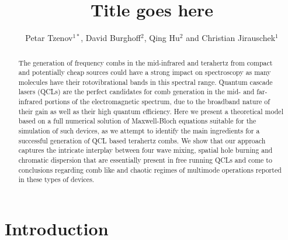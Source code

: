 \documentclass[10pt,letterpaper]{article}
\begin{document}
\title{Title goes here}
\author{Petar Tzenov$^{1*}$,  David Burghoff$^{2}$, Qing Hu$^{2}$ and Christian Jirauschek$^1$}

\address{$^1$ Institute for Nanoelectronics, Technical University f Munich, D-80333 Munich, Germany}
\address{$^2$ Department of Electrical Engineering and Computer Science, Research Laboratory of Electronics, Massachusetts Institute of Technology, Cambridge,
Massachusetts 02139, USA}




\begin{abstract}
The generation of frequency combs in the mid-infrared and terahertz from compact and potentially cheap sources could have a strong impact on spectroscopy as many molecules have their rotovibrational bands in this spectral range. Quantum cascade lasers (QCLs) are the perfect candidates for comb generation in the mid- and far-infrared portions of the electromagnetic spectrum, due to the broadband nature of their gain as well as their high quantum efficiency. Here we present a theoretical model based on a full numerical solution of  Maxwell-Bloch equations suitable for the simulation of such devices, as we attempt to identify the main ingredients for a successful generation of QCL based terahertz combs. We show that our approach captures the intricate interplay between four wave mixing, spatial hole burning and chromatic dispersion that are essentially present in free running QCLs and come to conclusions regarding comb like and chaotic regimes of multimode operations reported in these types of devices. 
\end{abstract}




\section{Introduction}
\label{sec:intro}
\end{document}

